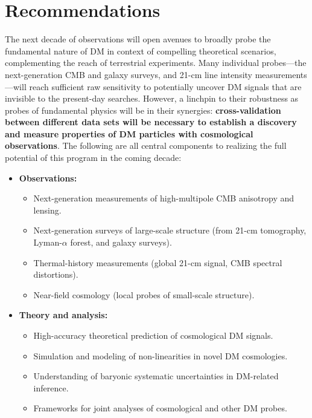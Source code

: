 \documentclass[12pt]{article}
\begin{document}
\section{Recommendations}
\label{sec:recommendations}
\vspace{-0.2cm}
The next decade of observations will open avenues to broadly probe the fundamental nature of DM in context of compelling theoretical scenarios, complementing the reach of terrestrial experiments.
Many individual probes---the next-generation CMB and galaxy surveys, and 21-cm line intensity measurements---will reach sufficient raw sensitivity to potentially uncover DM signals that are invisible to the present-day searches.
However, a linchpin to their robustness as probes of fundamental physics will be in their synergies: \textbf{cross-validation between different data sets will be necessary to establish a discovery and measure properties of DM particles with cosmological observations}. 
The following are all central components to realizing the full potential of this program in the coming decade:
\vspace{-0.cm}
\begin{itemize}
    \item \textbf{Observations:}
    \begin{itemize}
        \item Next-generation measurements of high-multipole CMB anisotropy and lensing.
        \item Next-generation surveys of large-scale structure (from 21-cm tomography, Lyman-$\alpha$ forest, and galaxy surveys).
        \item Thermal-history measurements (global 21-cm signal, CMB spectral distortions).
        \item Near-field cosmology (local probes of small-scale structure).
    \end{itemize}
    \vspace{-0.2cm}
    \item \textbf{Theory and analysis:}
    \begin{itemize}
        \item High-accuracy theoretical prediction of cosmological DM signals.
        \item Simulation and modeling of non-linearities in novel DM cosmologies.
        \item Understanding of baryonic systematic uncertainties in DM-related inference.
        \item Frameworks for joint analyses of cosmological and other DM probes.
        \end{itemize}
\end{itemize}
\pagebreak


\end{document}
